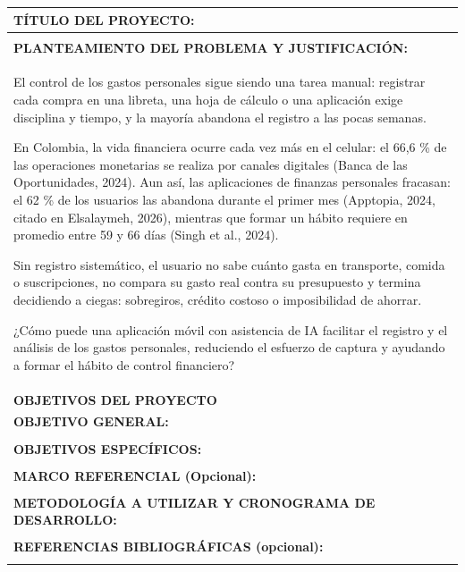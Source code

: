 \documentclass[11pt]{article}
\newcommand{\formlabel}[1]{\textbf{\small #1}}
\newcommand{\formcell}[1]{\small #1}
\begin{document}
\noindent
\begin{tabular}{|p{15.38cm}|}
\hline
\formlabel{TÍTULO DEL PROYECTO:} \\
\hline
\rule{0pt}{0.35cm} \\
\hline
\formlabel{PLANTEAMIENTO DEL PROBLEMA Y JUSTIFICACIÓN:} \\
\hline
\formcell{El control de los gastos personales sigue siendo una tarea manual: registrar cada compra en una libreta, una hoja de cálculo o una aplicación exige disciplina y tiempo, y la mayoría abandona el registro a las pocas semanas.

En Colombia, la vida financiera ocurre cada vez más en el celular: el 66,6 \% de las operaciones monetarias se realiza por canales digitales (Banca de las Oportunidades, 2024). Aun así, las aplicaciones de finanzas personales fracasan: el 62 \% de los usuarios las abandona durante el primer mes (Apptopia, 2024, citado en Elsalaymeh, 2026), mientras que formar un hábito requiere en promedio entre 59 y 66 días (Singh et al., 2024).

Sin registro sistemático, el usuario no sabe cuánto gasta en transporte, comida o suscripciones, no compara su gasto real contra su presupuesto y termina decidiendo a ciegas: sobregiros, crédito costoso o imposibilidad de ahorrar.

¿Cómo puede una aplicación móvil con asistencia de IA facilitar el registro y el análisis de los gastos personales, reduciendo el esfuerzo de captura y ayudando a formar el hábito de control financiero?} \\
\hline
\formlabel{OBJETIVOS DEL PROYECTO} \\
\hline
\formlabel{OBJETIVO GENERAL:} \\
\hline
\rule{0pt}{0.35cm} \\
\hline
\formlabel{OBJETIVOS ESPECÍFICOS:} \\
\hline
\rule{0pt}{0.35cm} \\
\hline
\formlabel{MARCO REFERENCIAL (Opcional):} \\
\hline
\rule{0pt}{0.35cm} \\
\hline
\formlabel{METODOLOGÍA A UTILIZAR Y CRONOGRAMA DE DESARROLLO:} \\
\hline
\rule{0pt}{0.35cm} \\
\hline
\formlabel{REFERENCIAS BIBLIOGRÁFICAS (opcional):} \\
\hline
\rule{0pt}{0.35cm} \\
\hline
\end{tabular}
\end{document}
